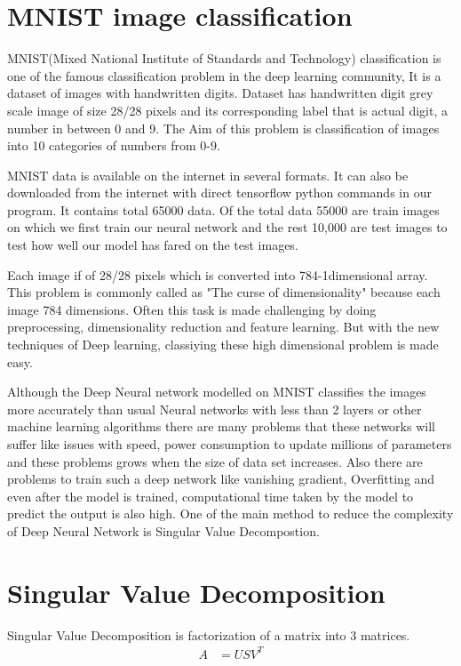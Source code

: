 {\section{MNIST image classification }

MNIST(Mixed National Institute of Standards and Technology) classification is
one of the famous classification problem in the deep learning community, It is a
dataset of images with handwritten digits. Dataset has handwritten digit grey
scale image of size 28/28 pixels and its corresponding label that is actual
digit, a number in between 0 and 9. The Aim of this problem is classification of
images into  10 categories of numbers from 0-9. 


MNIST data is available on the internet in several formats. It can also be
downloaded from the internet with direct tensorflow python commands in our
program. It contains total 65000 data. Of the total data 55000 are train images
on which we first train  our neural network and the rest 10,000 are test images
to test how well our model has fared on the test images.

Each image if of 28/28 pixels which is converted into 784-1dimensional array.
This problem is commonly called as "The curse of dimensionality" because each
image 784  dimensions. Often this task is made challenging by doing
preprocessing, dimensionality reduction and feature learning. But with the new
techniques of Deep learning, classiying these high dimensional problem is made
easy.


Although the Deep Neural network modelled on MNIST classifies the images more
accurately than usual Neural networks with less than 2 layers or other machine
learning algorithms there are many problems that these networks will suffer like
issues with speed, power consumption to update millions of parameters and  these
problems grows when the size of data set increases. Also there are problems to
train such a deep network like vanishing gradient, Overfitting and even after
the model is trained, computational time taken by the model to predict the
output is also high. One of the main method to reduce the complexity of Deep
Neural Network is Singular Value Decompostion.

\section{Singular Value Decomposition}

Singular Value Decomposition is factorization of a matrix into 3 matrices.
\begin{align*}  
A&=USV^{T}  
\end{align*}

}

